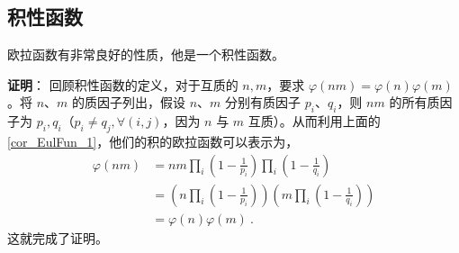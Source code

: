 \subsection{积性函数}
\begin{theorem}{}
欧拉函数有非常良好的性质，他是一个积性函数。
\end{theorem}
\textbf{证明}：
回顾积性函数的定义，对于互质的 $n, m$，要求 $\varphi(n m ) = \varphi(n) \varphi(m)$。将 $n$、$m$ 的质因子列出，假设 $n$、$m$ 分别有质因子 $p_i$、$q_i$，则 $nm$ 的所有质因子为 $p_i, q_i$（$p_i \neq q_j, \forall (i, j)$，因为 $n$ 与 $m$ 互质）。从而利用上面的\autoref{cor_EulFun_1}，他们的积的欧拉函数可以表示为，
\begin{equation}
\begin{aligned}
\varphi(n m) &= nm \prod_i \left(1-\frac1{p_i}\right) \prod_i \left(1-\frac1{q_i}\right)\\
&= \left(n \prod_i \left(1 - \frac1{p_i}\right)\right) \left(m \prod_i \left(1 - \frac1{q_i}\right)\right)\\
&= \varphi(n) \varphi(m) ~.
\end{aligned}
\end{equation}
这就完成了证明。

